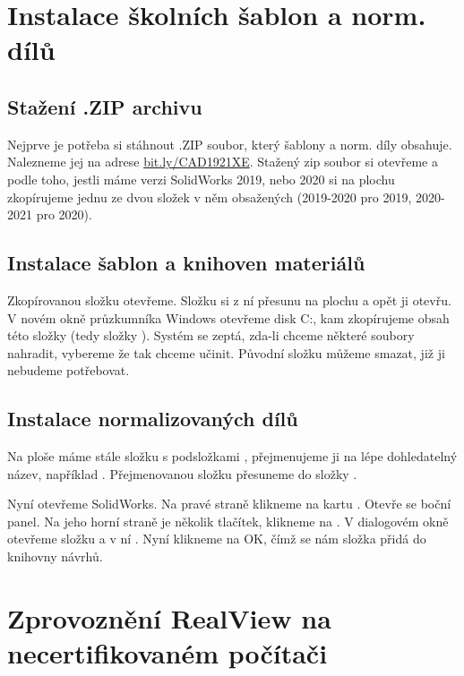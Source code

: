 \fxnote[author=PŠ]{\textcolor{red}{Sekce rozepsaná, NUTNO DOKONČIT}}

\section{Instalace školních šablon a norm. dílů}

\subsection*{Stažení .ZIP archivu}
Nejprve je potřeba si stáhnout .ZIP soubor, který šablony a norm. díly obsahuje.
Nalezneme jej na adrese \href{https://bit.ly/CAD1921XE}{bit.ly/CAD1921XE}.
Stažený zip soubor si otevřeme a podle toho, jestli máme verzi SolidWorks 2019, nebo 2020 si na plochu zkopírujeme jednu ze dvou složek v něm obsažených (2019-2020 pro 2019, 2020-2021 pro 2020).

\subsection*{Instalace šablon a knihoven materiálů}
Zkopírovanou složku otevřeme.
Složku  si z ní přesunu na plochu a opět ji otevřu.
V novém okně průzkumníka Windows otevřeme disk C:, kam zkopírujeme obsah této složky (tedy složky ).
Systém se zeptá, zda-li chceme některé soubory nahradit, vybereme že tak chceme učinit.
Původní složku  můžeme smazat, již ji nebudeme potřebovat.

\subsection*{Instalace normalizovaných dílů}
Na ploše máme stále složku s podsložkami , přejmenujeme ji na lépe dohledatelný název, například .
Přejmenovanou složku přesuneme do složky .

\noindent Nyní otevřeme SolidWorks.
Na pravé straně klikneme na kartu .
Otevře se boční panel.
Na jeho horní straně je několik tlačítek, klikneme na .
V dialogovém okně otevřeme složku  a v ní .
Nyní klikneme na OK, čímž se nám složka přidá do knihovny návrhů.

\section{Zprovoznění RealView na necertifikovaném počítači}
